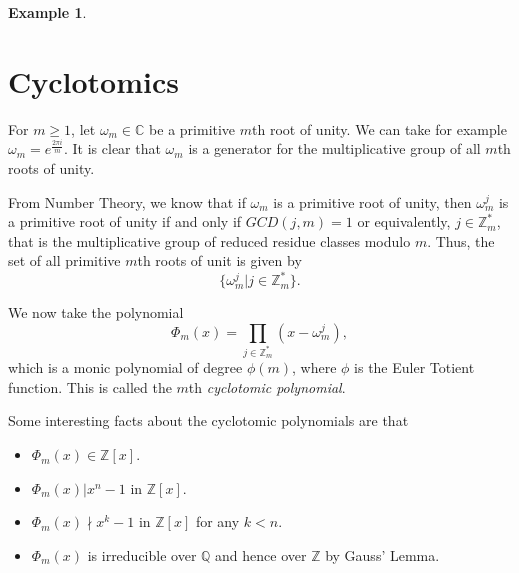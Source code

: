 \documentclass[12pt]{article}
\theoremstyle{plain}
\newtheorem{example}{Example}
\theoremstyle{definition}
\theoremstyle{remark}
\begin{document}
\begin{example}
\begin{enumerate}

\end{enumerate}
\end{example}


\section{Cyclotomics}
For $m\geq 1$, let $\omega_m \in \mathbb{C}$ be a primitive $m$th root of unity. We can take for example $\omega_m = e^{\frac{2\pi i}{m}}$. It is clear that $\omega_m$ is a generator for the multiplicative group of all $m$th roots of unity. 

From Number Theory, we know that if $\omega_m$ is a primitive root of unity, then $\omega_m^j$ is a primitive root of unity if and only if $GCD(j,m)=1$ or equivalently, $j\in \mathbb{Z}^*_m$, that is the multiplicative group of reduced residue classes modulo $m$. Thus, the set of all primitive $m$th roots of unit is given by 
$$\{\omega_m^j| j \in \mathbb{Z}^*_m\}. $$

We now take the polynomial 
$$\Phi_m(x) = \prod_{j\in \mathbb{Z}^*_m} (x-\omega_m^j),$$
which is a monic polynomial of degree $\phi(m)$, where $\phi$ is the Euler Totient function. This is called the $m$th {\it cyclotomic polynomial}. 

Some interesting facts about the cyclotomic polynomials are that 
\begin{itemize}
\item $\Phi_m(x) \in \mathbb{Z}[x]$.
\item $\Phi_m(x)|x^n-1$ in $\mathbb{Z}[x]$.
\item $\Phi_m(x)\nmid x^k-1$ in $\mathbb{Z}[x]$ for any $k<n$.
\item $\Phi_m(x)$ is irreducible over $\mathbb{Q}$ and hence over $\mathbb{Z}$ by Gauss' Lemma. 
\end{itemize}
\end{document}
